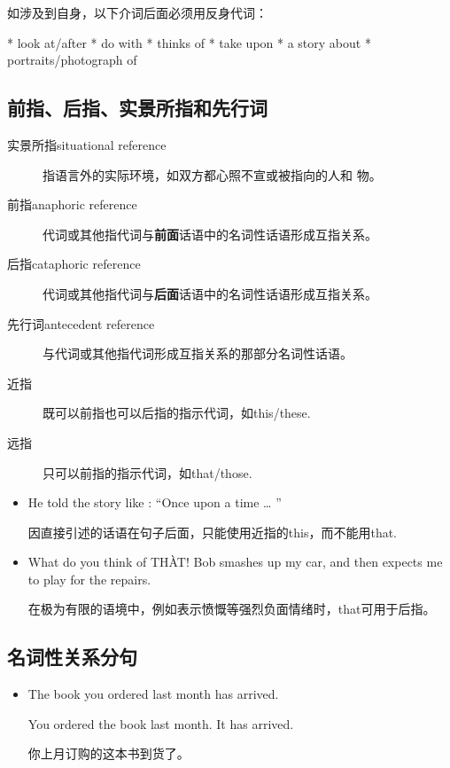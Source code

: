如涉及到自身，以下介词后面必须用反身代词：
\begin{taskitem}
  * look at/after
  * do with
  * thinks of
  * take upon
  * a story about
  * portraits/photograph of
\end{taskitem}

\subsection{前指、后指、实景所指和先行词}
\label{sub:anacata}

\begin{description}
\item[实景所指situational reference] 指语言外的实际环境，如双方都心照不宣或被指向的人和
  物。
\item[前指anaphoric reference] 代词或其他指代词与\textbf{前面}话语中的名词性话语形成互指关系。
\item[后指cataphoric reference] 代词或其他指代词与\textbf{后面}话语中的名词性话语形成互指关系。
\item[先行词antecedent reference] 与代词或其他指代词形成互指关系的那部分名词性话语。
\item[近指] 既可以前指也可以后指的指示代词，如this/these.
\item[远指] 只可以前指的指示代词，如that/those.
\end{description}

\begin{itemize}

\item He told the story like : ``Once upon a time \ldots{} ''

  因直接引述的话语在句子后面，只能使用近指的this，而不能用that.

\item What do you think of TH\`{A}T! Bob smashes up my car, and then expects me to
  play for the repairs.

  在极为有限的语境中，例如表示愤慨等强烈负面情绪时，that可用于后指。
\end{itemize}

\subsection{名词性关系分句}

\begin{itemize}
\item The book  you ordered last month has arrived.

  You ordered the book last month. It has arrived.

  你上月订购的这本书到货了。
\end{itemize}


